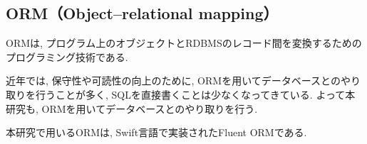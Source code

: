 \documentclass[../../../main]{subfiles}
\begin{document}
    \subsection{ORM（Object–relational mapping）}\label{subsec:phraseology-orm}

    ORMは, プログラム上のオブジェクトとRDBMSのレコード間を変換するためのプログラミング技術である. \cite{ORM}

    近年では, 保守性や可読性の向上のために, ORMを用いてデータベースとのやり取りを行うことが多く, SQLを直接書くことは少なくなってきている. よって本研究も, ORMを用いてデータベースとのやり取りを行う.

    本研究で用いるORMは, Swift言語で実装されたFluent ORMである.
\end{document}
